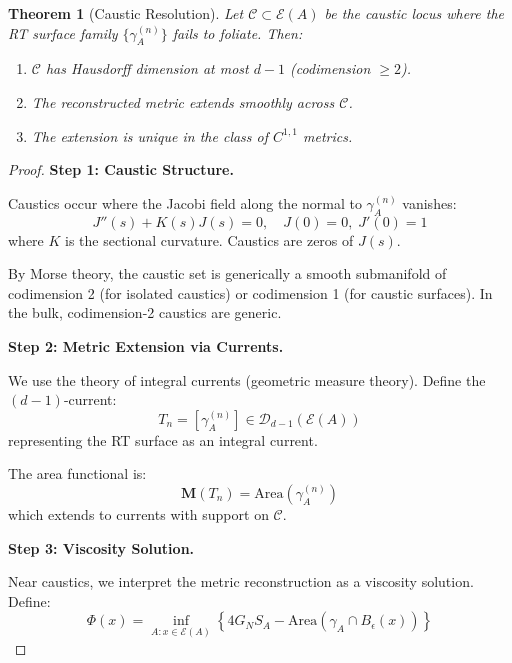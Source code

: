 \documentclass[12pt,a4paper]{article}
\newtheorem{theorem}{Theorem}[section]
\begin{document}
\begin{theorem}[Caustic Resolution]\label{thm:caustic-resolution}
Let $\mathcal{C} \subset \mathcal{E}(A)$ be the caustic locus where the RT surface family $\{\gamma_A^{(n)}\}$ fails to foliate. Then:
\begin{enumerate}
    \item $\mathcal{C}$ has Hausdorff dimension at most $d-1$ (codimension $\geq 2$).
    \item The reconstructed metric extends smoothly across $\mathcal{C}$.
    \item The extension is unique in the class of $C^{1,1}$ metrics.
\end{enumerate}
\end{theorem}

\begin{proof}
\textbf{Step 1: Caustic Structure.}

Caustics occur where the Jacobi field along the normal to $\gamma_A^{(n)}$ vanishes:
\begin{equation}
J''(s) + K(s) J(s) = 0, \quad J(0) = 0, \; J'(0) = 1
\end{equation}
where $K$ is the sectional curvature. Caustics are zeros of $J(s)$.

By Morse theory, the caustic set is generically a smooth submanifold of codimension 2 (for isolated caustics) or codimension 1 (for caustic surfaces). In the bulk, codimension-2 caustics are generic.

\textbf{Step 2: Metric Extension via Currents.}

We use the theory of integral currents (geometric measure theory). Define the $(d-1)$-current:
\begin{equation}
T_n = [\gamma_A^{(n)}] \in \mathcal{D}_{d-1}(\mathcal{E}(A))
\end{equation}
representing the RT surface as an integral current.

The area functional is:
\begin{equation}
\mathbf{M}(T_n) = \text{Area}(\gamma_A^{(n)})
\end{equation}
which extends to currents with support on $\mathcal{C}$.

\textbf{Step 3: Viscosity Solution.}

Near caustics, we interpret the metric reconstruction as a viscosity solution. Define:
\begin{equation}
\Phi(x) = \inf_{A: x \in \mathcal{E}(A)} \left\{ 4G_N S_A - \text{Area}(\gamma_A \cap B_\epsilon(x)) \right\}
\end{equation}


\end{proof}
\end{document}
